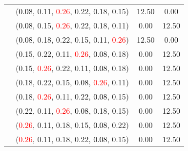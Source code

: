 \documentclass[10pt,a4paper]{report}
\begin{document}
\begin{center}
\begin{longtable}{clcc}
			&(\textcolor{black}{0.08}, 0.11, \textcolor{red}{0.26}, 0.22, 0.18, 0.15)&12.50&0.00\\
			&(\textcolor{black}{0.08}, 0.15, \textcolor{red}{0.26}, 0.22, 0.18, 0.11)&0.00&12.50\\
			&(\textcolor{black}{0.08}, 0.18, 0.22, 0.15, 0.11, \textcolor{red}{0.26})&12.50&0.00\\
			&(0.15, 0.22, 0.11, \textcolor{red}{0.26}, \textcolor{black}{0.08}, 0.18)&0.00&12.50\\
			&(0.15, \textcolor{red}{0.26}, 0.22, 0.11, \textcolor{black}{0.08}, 0.18)&0.00&12.50\\
			&(0.18, 0.22, 0.15, \textcolor{black}{0.08}, \textcolor{red}{0.26}, 0.11)&0.00&12.50\\
			&(0.18, \textcolor{red}{0.26}, 0.11, 0.22, \textcolor{black}{0.08}, 0.15)&0.00&12.50\\
			&(0.22, 0.11, \textcolor{red}{0.26}, \textcolor{black}{0.08}, 0.18, 0.15)&0.00&12.50\\
			&(\textcolor{red}{0.26}, 0.11, 0.18, 0.15, \textcolor{black}{0.08}, 0.22)&0.00&12.50\\
			&(\textcolor{red}{0.26}, 0.11, 0.18, 0.22, \textcolor{black}{0.08}, 0.15)&0.00&12.50\\
		\bottomrule
	\end{longtable}
\end{center}
\end{document}
